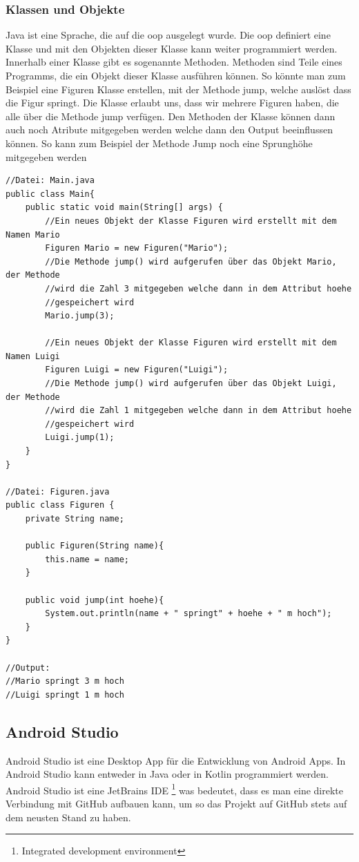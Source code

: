 \subsubsection{Klassen und Objekte}
Java ist eine Sprache, die auf die \gls{oop} ausgelegt wurde. Die \gls{oop} definiert eine Klasse und mit den Objekten dieser Klasse kann weiter programmiert werden. Innerhalb einer Klasse gibt es sogenannte Methoden. Methoden sind Teile eines Programms, die ein Objekt dieser Klasse ausführen können. So könnte man zum Beispiel eine Figuren Klasse erstellen, mit der Methode jump, welche auslöst dass die Figur springt. Die Klasse erlaubt uns, dass wir mehrere Figuren haben, die alle über die Methode jump verfügen. Den Methoden der Klasse können dann auch noch Atribute mitgegeben werden welche dann den Output beeinflussen können. So kann zum Beispiel der Methode Jump noch eine Sprunghöhe mitgegeben werden
\clearpage
\begin{verbatim}
//Datei: Main.java
public class Main{
    public static void main(String[] args) {
        //Ein neues Objekt der Klasse Figuren wird erstellt mit dem Namen Mario
        Figuren Mario = new Figuren("Mario");
        //Die Methode jump() wird aufgerufen über das Objekt Mario, der Methode
        //wird die Zahl 3 mitgegeben welche dann in dem Attribut hoehe 
        //gespeichert wird
        Mario.jump(3);

        //Ein neues Objekt der Klasse Figuren wird erstellt mit dem Namen Luigi
        Figuren Luigi = new Figuren("Luigi");
        //Die Methode jump() wird aufgerufen über das Objekt Luigi, der Methode
        //wird die Zahl 1 mitgegeben welche dann in dem Attribut hoehe 
        //gespeichert wird
        Luigi.jump(1);
    }
}

//Datei: Figuren.java
public class Figuren {
    private String name;

    public Figuren(String name){
        this.name = name;
    }

    public void jump(int hoehe){
        System.out.println(name + " springt" + hoehe + " m hoch");
    }
}

//Output:
//Mario springt 3 m hoch
//Luigi springt 1 m hoch
\end{verbatim}

\subsection{Android Studio}
Android Studio ist eine Desktop App für die Entwicklung von Android Apps. In Android Studio kann entweder in Java oder in Kotlin programmiert werden. Android Studio ist eine JetBrains IDE \footnote{Integrated development environment} was bedeutet, dass es man eine direkte Verbindung mit GitHub aufbauen kann, um so das Projekt auf GitHub stets auf dem neusten Stand zu haben.

